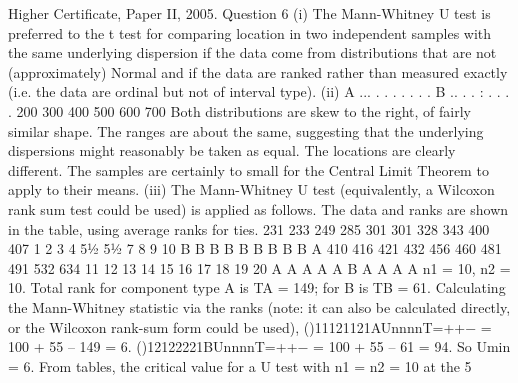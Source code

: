 Higher Certificate, Paper II, 2005. Question 6
(i) The Mann-Whitney U test is preferred to the t test for comparing location in two independent samples with the same underlying dispersion if the data come from distributions that are not (approximately) Normal and if the data are ranked rather than measured exactly (i.e. the data are ordinal but not of interval type).
(ii)
A
... . . . . .
.
.
B
.. . .
: . .
. .
200 300 400 500 600 700
Both distributions are skew to the right, of fairly similar shape. The ranges are about the same, suggesting that the underlying dispersions might reasonably be taken as equal. The locations are clearly different. The samples are certainly to small for the Central Limit Theorem to apply to their means.
(iii) The Mann-Whitney U test (equivalently, a Wilcoxon rank sum test could be used) is applied as follows. The data and ranks are shown in the table, using average ranks for ties.
231
233
249
285
301
301
328
343
400
407
1
2
3
4
5½
5½
7
8
9
10
B
B
B
B
B
B
B
B
B
A
410
416
421
432
456
460
481
491
532
634
11
12
13
14
15
16
17
18
19
20
A
A
A
A
A
B
A
A
A
A
n1 = 10, n2 = 10. Total rank for component type A is TA = 149; for B is TB = 61.
Calculating the Mann-Whitney statistic via the ranks (note: it can also be calculated directly, or the Wilcoxon rank-sum form could be used),
()11121121AUnnnnT=++− = 100 + 55 – 149 = 6.
()12122221BUnnnnT=++− = 100 + 55 – 61 = 94.
So Umin = 6. From tables, the critical value for a U test with n1 = n2 = 10 at the 5%
